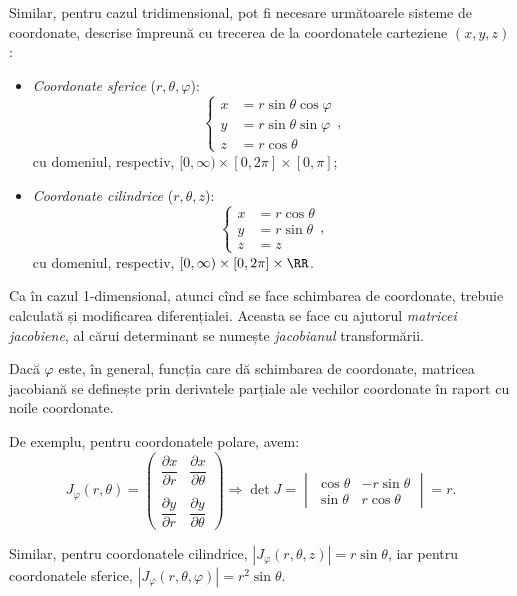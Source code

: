 Similar, pentru cazul tridimensional, pot fi necesare următoarele sisteme de coordonate,
descrise împreună cu trecerea de la coordonatele carteziene $ (x, y, z) $:
\begin{itemize}
\item \emph{Coordonate sferice} ($r, \theta, \varphi$):
  \[
    \begin{cases}
      x &= r \sin \theta \cos \varphi \\
      y &= r \sin \theta \sin \varphi \\
      z &= r \cos \theta
    \end{cases},
  \]
  cu domeniul, respectiv, $ [0, \infty) \times [0, 2\pi] \times [0, \pi] $;
\item \emph{Coordonate cilindrice} ($r, \theta, z$):
  \[
    \begin{cases}
      x &= r \cos \theta \\
      y &= r \sin \theta \\
      z &= z
    \end{cases},
  \]
  cu domeniul, respectiv, $ [0, \infty) \times [0, 2 \pi] \times \RR $.
\end{itemize}

Ca în cazul 1-dimensional, atunci cînd se face schimbarea de coordonate, trebuie
calculată și modificarea diferențialei. Aceasta se face cu ajutorul
\emph{matricei jacobiene}, al cărui determinant se numește \emph{jacobianul}
transformării. 

Dacă $ \varphi $ este, în general, funcția care dă schimbarea de coordonate,
matricea jacobiană se definește prin derivatele parțiale ale vechilor coordonate
în raport cu noile coordonate.

De exemplu, pentru coordonatele polare, avem:
\[
  J_\varphi(r, \theta) = %
  \begin{pmatrix}
    \dfrac{\partial x}{\partial r} & \dfrac{\partial x}{\partial \theta} \\
    & \\
    \dfrac{\partial y}{\partial r} & \dfrac{\partial y}{\partial \theta}
  \end{pmatrix} \Rightarrow \det J = %
  \begin{vmatrix}
    \cos \theta & -r \sin \theta \\
    \sin \theta & r \cos \theta
  \end{vmatrix} = r.
\]

Similar, pentru coordonatele cilindrice, $ |J_\varphi(r, \theta, z)| = r \sin \theta $,
iar pentru coordonatele sferice, $ |J_\varphi(r, \theta, \varphi)| = r^2 \sin \theta $.

